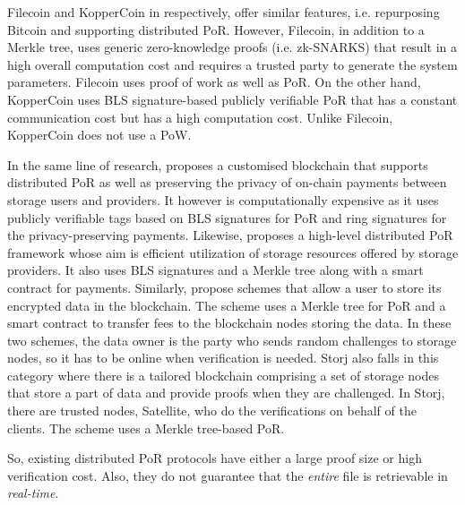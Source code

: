 Filecoin and KopperCoin in \cite{Filecoin,KoppBK16} respectively, offer  similar features, i.e. repurposing Bitcoin and supporting distributed PoR.  However, Filecoin, in addition to a Merkle tree, uses  generic zero-knowledge proofs (i.e. zk-SNARKS) that result in a high  overall computation  cost and requires a trusted party to generate the system parameters. Filecoin uses proof of work as well as PoR. On the other hand, 
 KopperCoin uses BLS signature-based publicly verifiable PoR that has a constant communication cost but has a high computation cost. Unlike Filecoin, KopperCoin does not use a PoW. 

In the same line of research, \cite{KoppMHKB17} proposes a customised blockchain  that supports distributed PoR as well as  preserving the privacy of on-chain payments between storage users and providers. It however is computationally expensive as it uses publicly verifiable  tags based on  BLS signatures for PoR and ring signatures for the privacy-preserving payments.  Likewise, \cite{RujRBK18} proposes a high-level distributed PoR framework whose aim is efficient utilization of  storage resources offered by storage providers. It also uses BLS signatures and a Merkle tree along with a smart contract  for payments. Similarly, \cite{XueX0B18,XueXB19} propose  schemes that allow a user to store its encrypted data in the blockchain. The scheme uses a Merkle tree  for PoR   and a smart contract to transfer fees to the blockchain nodes storing  the data. In these two schemes, the data owner  is the party who sends random challenges  to  storage nodes, so it has to be  online when  verification is needed. Storj \cite{storj14} also falls in this category where there is a tailored blockchain comprising a set of storage nodes that store a part of data and provide  proofs when they are challenged. In Storj, there are trusted nodes, Satellite, who do the verifications on behalf of the clients.  The scheme uses a Merkle tree-based   PoR. 

So,  existing distributed PoR protocols have either a large proof size or  high verification cost. Also,  they do not guarantee  that the \emph{entire} file is retrievable in  \emph{real-time}. 



